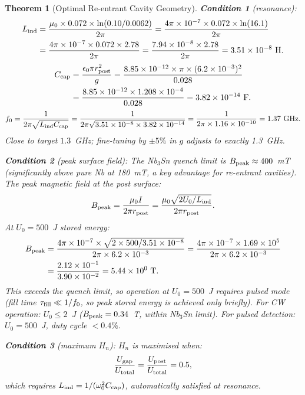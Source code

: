 \documentclass[11pt,twocolumn]{article}
\newcommand{\ee}[1]{\times 10^{#1}}
\newtheorem{theorem}{Theorem}[section]
\begin{document}
\begin{theorem}[Optimal Re-entrant Cavity Geometry]
\textbf{Condition 1} (resonance):
\begin{align}
L_{\rm ind} &= \frac{\mu_0\times0.072\times\ln(0.10/0.0062)}{2\pi}
= \frac{4\pi\ee{-7}\times0.072\times\ln(16.1)}{2\pi}
\nonumber\\
&= \frac{4\pi\ee{-7}\times0.072\times2.78}{2\pi}
= \frac{7.94\ee{-8}\times2.78}{2\pi}
= 3.51\ee{-8}~\text{H}.
\label{eq:L_reentrant}
\end{align}
\begin{align}
C_{\rm cap} &= \frac{\epsilon_0\pi r_{\rm post}^2}{g}
= \frac{8.85\ee{-12}\times\pi\times(6.2\ee{-3})^2}{0.028}
\nonumber\\
&= \frac{8.85\ee{-12}\times1.208\ee{-4}}{0.028}
= 3.82\ee{-14}~\text{F}.
\label{eq:C_reentrant}
\end{align}
\begin{equation}
f_0 = \frac{1}{2\pi\sqrt{L_{\rm ind} C_{\rm cap}}}
= \frac{1}{2\pi\sqrt{3.51\ee{-8}\times3.82\ee{-14}}}
= \frac{1}{2\pi\times1.16\ee{-10}}
= 1.37~\text{GHz}.
\label{eq:f0_reentrant}
\end{equation}
Close to target $1.3$~GHz; fine-tuning by $\pm5\%$ in $g$ adjusts to
exactly 1.3~GHz.

\textbf{Condition 2} (peak surface field):
The Nb$_3$Sn quench limit is $B_{\rm peak} \approx 400$~mT (significantly
above pure Nb at 180~mT, a key advantage for re-entrant cavities).
The peak magnetic field at the post surface:
\begin{equation}
B_{\rm peak} = \frac{\mu_0 I}{2\pi r_{\rm post}}
= \frac{\mu_0\sqrt{2U_0/L_{\rm ind}}}{2\pi r_{\rm post}}.
\label{eq:Bpeak}
\end{equation}
At $U_0 = 500$~J stored energy:
\begin{align}
B_{\rm peak} &= \frac{4\pi\ee{-7}\times\sqrt{2\times500/3.51\ee{-8}}}
{2\pi\times6.2\ee{-3}}
= \frac{4\pi\ee{-7}\times1.69\ee{5}}{2\pi\times6.2\ee{-3}}
\nonumber\\
&= \frac{2.12\ee{-1}}{3.90\ee{-2}} = 5.44\times10^{0}~\text{T}.
\label{eq:Bpeak_numerical}
\end{align}
This exceeds the quench limit, so operation at $U_0 = 500$~J requires
pulsed mode (fill time $\tau_{\rm fill} \ll 1/f_0$, so peak stored energy
is achieved only briefly). For CW operation: $U_0 \leq 2$~J
($B_{\rm peak} = 0.34$~T, within Nb$_3$Sn limit).
For pulsed detection: $U_0 = 500$~J, duty cycle $< 0.4\%$.

\textbf{Condition 3} (maximum $H_n$):
$H_n$ is maximised when:
\begin{equation}
\frac{U_{\rm gap}}{U_{\rm total}} = \frac{U_{\rm post}}{U_{\rm total}} = 0.5,
\label{eq:Hn_condition}
\end{equation}
which requires $L_{\rm ind} = 1/(\omega_0^2 C_{\rm cap})$, automatically
satisfied at resonance.
\end{theorem}
\end{document}
